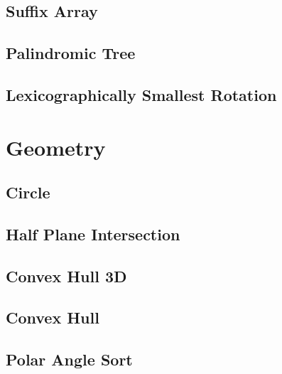 \documentclass[a4paper,10pt,twocolumn,oneside]{article}
\begin{document}
\subsection{Suffix Array}


\subsection{Palindromic Tree}


\subsection{Lexicographically Smallest Rotation}


\section{Geometry}
\subsection{Circle}


\subsection{Half Plane Intersection}


%

\subsection{Convex Hull 3D}


\subsection{Convex Hull}


\subsection{Polar Angle Sort}

\end{document}
